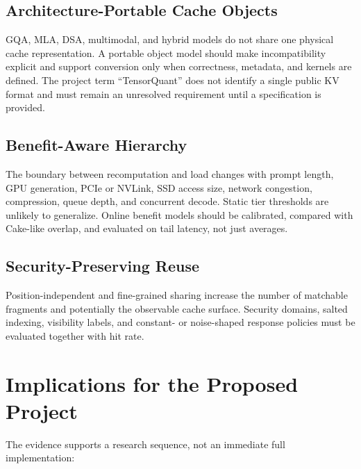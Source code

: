 \documentclass[conference,10pt]{IEEEtran}
\begin{document}
\subsection{Architecture-Portable Cache Objects}

GQA, MLA, DSA, multimodal, and hybrid models do not share one physical cache representation. A portable object model should make incompatibility explicit and support conversion only when correctness, metadata, and kernels are defined. The project term ``TensorQuant'' does not identify a single public KV format and must remain an unresolved requirement until a specification is provided.

\subsection{Benefit-Aware Hierarchy}

The boundary between recomputation and load changes with prompt length, GPU generation, PCIe or NVLink, SSD access size, network congestion, compression, queue depth, and concurrent decode. Static tier thresholds are unlikely to generalize. Online benefit models should be calibrated, compared with Cake-like overlap, and evaluated on tail latency, not just averages.

\subsection{Security-Preserving Reuse}

Position-independent and fine-grained sharing increase the number of matchable fragments and potentially the observable cache surface. Security domains, salted indexing, visibility labels, and constant- or noise-shaped response policies must be evaluated together with hit rate.

\section{Implications for the Proposed Project}

The evidence supports a research sequence, not an immediate full implementation:
\end{document}
